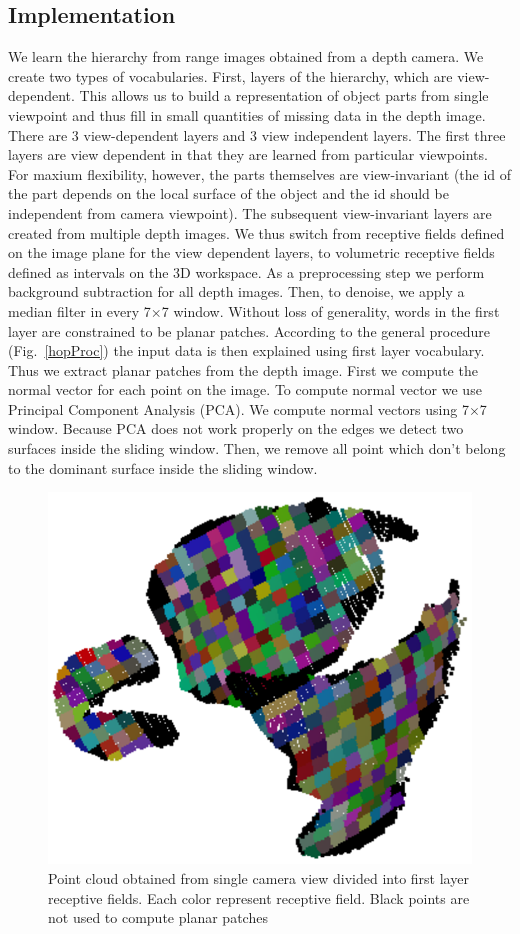 \documentclass[letterpaper,10pt,conference]{ieeeconf}  %
\begin{document}
\subsection{Implementation}

We learn the hierarchy from range images obtained from a depth camera. We create two types of vocabularies. First, layers of the hierarchy, which are view-dependent. This allows us to build a representation of object parts from single viewpoint and thus fill in small quantities of missing data in the depth image. There are 3 view-dependent layers and 3 view independent layers. The first three layers are view dependent in that they are learned from particular viewpoints. For maxium flexibility, however, the parts themselves are view-invariant (the id of the part depends on the local surface of the object and the id should be independent from camera viewpoint).  The subsequent view-invariant layers are created from multiple depth images. We thus switch from receptive fields defined on the image plane for the  view dependent layers, to volumetric receptive fields defined as intervals on the 3D workspace.
As a preprocessing step we perform background subtraction for all depth images. Then, to denoise, we apply a median filter in every 7$\times$7 window. Without loss of generality, words in the first layer are constrained to be planar patches. According to the general procedure (Fig.~\ref{hopProc}) the input data is then explained using first layer vocabulary. Thus we extract planar patches from the depth image. First we compute the normal vector for each point on the image. To compute normal vector we use Principal Component Analysis (PCA). We compute normal vectors using 7$\times$7 window. Because PCA does not work properly on the edges we detect two surfaces inside the sliding window. Then, we remove all point which don't belong to the dominant surface inside the sliding window.

\begin{figure}[t]
 \centering
\includegraphics[width=0.5\columnwidth]{../images/recFields1.eps}
\caption{Point cloud obtained from single camera view divided into first layer receptive fields. Each color represent receptive field. Black points are not used to compute planar patches}
 \label{recFields1}
\end{figure}
\end{document}
